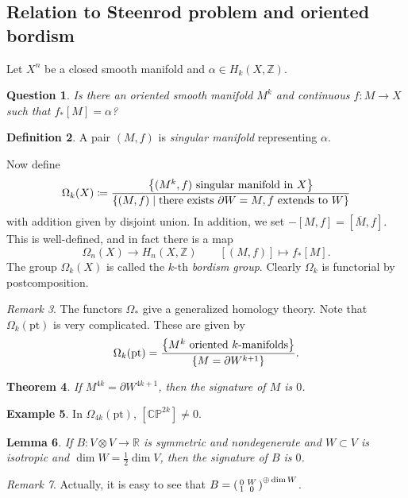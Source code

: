 \documentclass[leqno, openany]{memoir}
\newtheorem{thm}{Theorem}[section]
\newtheorem{lem}[thm]{Lemma}
\newtheorem{quest}[thm]{Question}
\theoremstyle{definition}
\newtheorem{defn}[thm]{Definition}
\newtheorem{exm}[thm]{Example}
\theoremstyle{remark}
\newtheorem{rmk}[thm]{Remark}
\theoremstyle{plain}
\theoremstyle{definition}
\theoremstyle{remark}
\newcommand{\R}{\mathbb{R}}
\newcommand{\C}{\mathbb{C}}
\newcommand{\Z}{\mathbb{Z}}
\renewcommand{\P}{\mathbb{P}}
\newcommand{\mr}[1]{\mathrm{#1}}
\newcommand{\ol}[1]{\overline{#1}}
\begin{document}
\subsection{Relation to Steenrod problem and oriented bordism}%
\label{sub:relation_to_steenrod_problem_and_oriented_bordism}

Let $X^n$ be a closed smooth manifold and $\alpha \in H_k(X, \Z)$.
\begin{quest}
    Is there an oriented smooth manifold $M^k$ and continuous $f \colon M \to X$ such that $f_*[M] = \alpha$?
\end{quest}

\begin{defn}
    A pair $(M, f)$ is \textit{singular manifold} representing $\alpha$.
\end{defn}

Now define 
\[ \Omega_k(X) \coloneqq \frac{ \qty{(M^k, f)\ \text{singular manifold in $X$}} }{\qty{(M, f) \mid \text{there exists }\partial W = M, f\ \text{extends to $W$}}} \]
with addition given by disjoint union. In addition, we set $-[M, f] = [\ol{M}, f]$. This is well-defined, and in fact there is a map
\[ \Omega_n(X) \to H_n(X, \Z) \qquad [(M, f)] \mapsto f_*[M]. \]
The group $\Omega_k(X)$ is called the $k$-th \textit{bordism group}. Clearly $\Omega_k$ is functorial by postcomposition.

\begin{rmk}
    The functors $\Omega_*$ give a generalized homology theory. Note that $\Omega_k(\mr{pt})$ is very complicated. These are given by
    \[ \Omega_k(\mr{pt}) = \frac{\qty{M^k \text{ oriented $k$-manifolds}}}{\qty{M = \partial W^{k+1}}}. \]
\end{rmk}

\begin{thm}
    If $M^{4k} = \partial W^{4k+1}$, then the signature of $M$ is $0$.
\end{thm}

\begin{exm}
    In $\Omega_{4k}(\mr{pt})$, $[\C\P^{2k}] \neq 0$.
\end{exm}

\begin{lem}
    If $B \colon V \otimes V \to \R$ is symmetric and nondegenerate and $W \subset V$ is isotropic and $\dim W = \frac{1}{2} \dim V$, then the signature of $B$ is $0$.
\end{lem}

\begin{rmk}
    Actually, it is easy to see that $B = \begin{psmallmatrix}
        0 & W \\ 1 & 0
    \end{psmallmatrix}^{\oplus \dim W}$.
\end{rmk}
\end{document}
